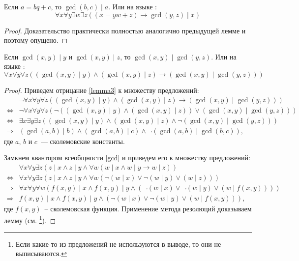 \documentclass[12pt, a4paper, oneside]{memoir}
\begin{document}
\begin{lemma}
    Если $a = bq+c$, то $\gcd(b, c) \mid a$.
    Или на языке \FA:
    \begin{equation}
        \forall x \forall y \exists w \exists z ((x = yw + z) \rightarrow \gcd(y, z) \mid x) \label{lemma2}
    \end{equation}
\end{lemma}
\begin{proof}
    Доказательство практически полностью аналогично предыдущей лемме и поэтому опущено.
\end{proof}

\begin{lemma}
    Если $\gcd(x, y) \mid y$ и $\gcd(x, y) \mid z$, то $\gcd(x, y) \mid \gcd(y, z)$.
    Или на языке \FA:
    \begin{equation} \label{lemma3}
        \forall x \forall y \forall z((\gcd(x, y) \mid y) \land (\gcd(x, y) \mid z) \rightarrow (\gcd(x, y) \mid \gcd(y, z)))
    \end{equation}
\end{lemma}
\begin{proof}
    Приведем отрицание \eqref{lemma3} к множеству предложений:
    \begin{align*}
                          & \lnot \forall x \forall y \forall z((\gcd(x, y) \mid y) \land (\gcd(x, y) \mid z) \rightarrow (\gcd(x, y) \mid \gcd(y, z)))  \\
        \Leftrightarrow{} & \lnot \forall x \forall y \forall z(\lnot ((\gcd(x, y) \mid y) \land (\gcd(x, y) \mid z)) \lor (\gcd(x, y) \mid \gcd(y, z))) \\
        \Leftrightarrow{} & \exists x \exists y \exists z ((\gcd(x, y) \mid y) \land (\gcd(x, y) \mid z) \land \lnot (\gcd(x, y) \mid \gcd(y, z)))       \\
        \Rightarrow{}     & (\gcd(a, b) \mid b) \land (\gcd(a, b) \mid c) \land \lnot (\gcd(a, b) \mid \gcd(b, c)),
    \end{align*}
    где $a$, $b$ и $c$~--- сколемовские константы.

    Замкнем квантором всеобщности \eqref{gcd} и приведем его к множеству предложений:
    \begin{align*}
                          & \forall x \forall y \exists z (z \mid x \land z \mid y \land \forall w (w \mid x \land w \mid y \rightarrow w \mid z))                   \\
        \Leftrightarrow{} & \forall x \forall y \exists z (z \mid x \land z \mid y \land \forall w (\lnot (w \mid x) \lor \lnot (w \mid y) \lor (w \mid z)))         \\
        \Rightarrow{}     & \forall x \forall y \forall w (f(x, y) \mid x \land f(x, y) \mid y \land (\lnot (w \mid x) \lor \lnot (w \mid y) \lor (w \mid f(x, y)))) \\
        \Rightarrow{}     & f(x, y) \mid x \land f(x, y) \mid y \land (\lnot (w \mid x) \lor \lnot (w \mid y) \lor (w \mid f(x, y))),
    \end{align*}
    где $f(x,y)$~-- сколемовская функция.
    Применение метода резолюций доказываем лемму (см. \footnote{Если какие-то из предложений не используются в выводе, то они не выписываются.}).
\end{proof}
\end{document}
